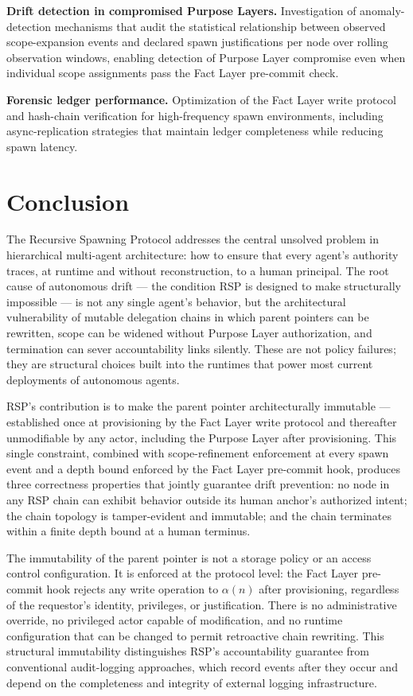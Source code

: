 \textbf{Drift detection in compromised Purpose Layers.} Investigation of anomaly-detection mechanisms that audit the statistical relationship between observed scope-expansion events and declared spawn justifications per node over rolling observation windows, enabling detection of Purpose Layer compromise even when individual scope assignments pass the Fact Layer pre-commit check.

\textbf{Forensic ledger performance.} Optimization of the Fact Layer write protocol and hash-chain verification for high-frequency spawn environments, including async-replication strategies that maintain ledger completeness while reducing spawn latency.

\section{Conclusion}\label{sec:rs-conclusion}

The Recursive Spawning Protocol addresses the central unsolved problem in hierarchical multi-agent architecture: how to ensure that every agent's authority traces, at runtime and without reconstruction, to a human principal. The root cause of autonomous drift — the condition RSP is designed to make structurally impossible — is not any single agent's behavior, but the architectural vulnerability of mutable delegation chains in which parent pointers can be rewritten, scope can be widened without Purpose Layer authorization, and termination can sever accountability links silently. These are not policy failures; they are structural choices built into the runtimes that power most current deployments of autonomous agents.

RSP's contribution is to make the parent pointer architecturally immutable — established once at provisioning by the Fact Layer write protocol and thereafter unmodifiable by any actor, including the Purpose Layer after provisioning. This single constraint, combined with scope-refinement enforcement at every spawn event and a depth bound enforced by the Fact Layer pre-commit hook, produces three correctness properties that jointly guarantee drift prevention: no node in any RSP chain can exhibit behavior outside its human anchor's authorized intent; the chain topology is tamper-evident and immutable; and the chain terminates within a finite depth bound at a human terminus.

The immutability of the parent pointer is not a storage policy or an access control configuration. It is enforced at the protocol level: the Fact Layer pre-commit hook rejects any write operation to $\alpha(n)$ after provisioning, regardless of the requestor's identity, privileges, or justification. There is no administrative override, no privileged actor capable of modification, and no runtime configuration that can be changed to permit retroactive chain rewriting. This structural immutability distinguishes RSP's accountability guarantee from conventional audit-logging approaches, which record events after they occur and depend on the completeness and integrity of external logging infrastructure.

